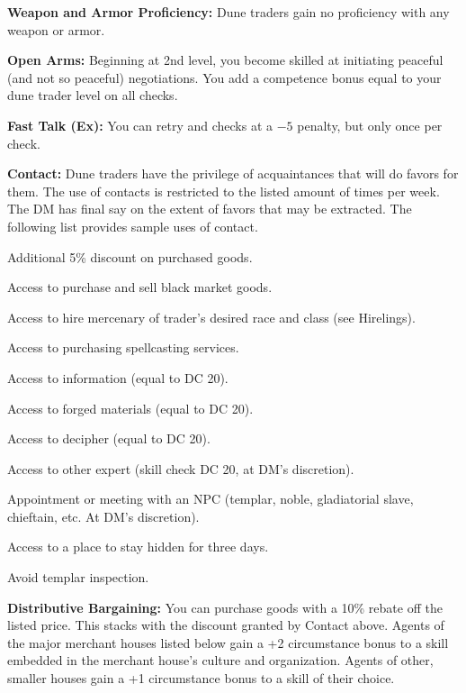 {
\textbf{Weapon and Armor Proficiency:} Dune traders gain no proficiency with any weapon or armor.

\textbf{Open Arms:} Beginning at 2nd level, you become skilled at initiating peaceful (and not so peaceful) negotiations. You add a competence bonus equal to \onehalf your dune trader level on all  checks.

\textbf{Fast Talk (Ex):} You can retry  and  checks at a $-5$ penalty, but only once per check.

\textbf{Contact:} Dune traders have the privilege of acquaintances that will do favors for them. The use of contacts is restricted to the listed amount of times per week. The DM has final say on the extent of favors that may be extracted. The following list provides sample uses of contact.

\begin{itemize*}
\item Additional 5\% discount on purchased goods.
\item Access to purchase and sell black market goods.
\item Access to hire mercenary of trader's desired race and class (see Hirelings).
\item Access to purchasing spellcasting services.
\item Access to information (equal to  DC 20).
\item Access to forged materials (equal to  DC 20).
\item Access to decipher (equal to  DC 20).
\item Access to other expert (skill check DC 20, at DM's discretion).
\item Appointment or meeting with an NPC (templar, noble, gladiatorial slave, chieftain, etc. At DM's discretion).
\item Access to a place to stay hidden for three days.
\item Avoid templar inspection.
\end{itemize*}

\textbf{Distributive Bargaining:} You can purchase goods with a 10\% rebate off the listed price. This stacks with the discount granted by Contact above. Agents of the major merchant houses listed below gain a +2 circumstance bonus to a skill embedded in the merchant house's culture and organization. Agents of other, smaller houses gain a +1 circumstance bonus to a skill of their choice.

}
